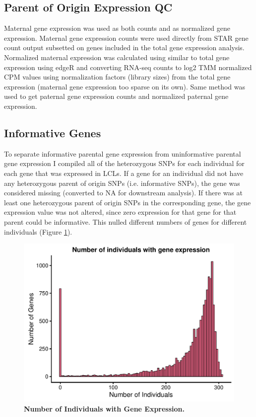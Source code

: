 \subsection{Parent of Origin Expression QC}\label{Parent of Origin Expression QC}
Maternal gene expression was used as both counts and as normalized gene expression. Maternal gene expression counts were used directly from STAR gene count output\cite{Dobin:2002by} subsetted on genes included in the total gene expression analysis. 
Normalized maternal expression was calculated using similar to total gene expression using edgeR and converting RNA-seq counts to log2 TMM normalized CPM values using normalization factors (library sizes) from the total gene expression (maternal gene expression too sparse on its own). Same method was used to get paternal gene expression counts and normalized paternal gene expression.

\subsection{Informative Genes}\label{Informative Genes}
To separate informative parental gene expression from uninformative parental gene expression I compiled all of the heterozygous SNPs for each individual for each gene that was expressed in LCLs. If a gene for an individual did not have any heterozygous parent of origin SNPs (i.e. informative SNPs), the gene was considered missing (converted to NA for downstream analysis). If there was at least one heterozygous parent of origin SNPs in the corresponding gene, the gene expression value was not altered, since zero expression for that gene for that parent could be informative. This nulled different numbers of genes for different individuals (Figure \ref{fig:indspergene}).

\begin{figure}[!htb]
\centering \includegraphics[width=5in]{img/ch04/fig-08-individualspergene.pdf}
\caption[Number of Individuals with Gene Expression.]{\textbf{Number of Individuals with Gene Expression.} }
\label{fig:indspergene}
\end{figure}
\clearpage


